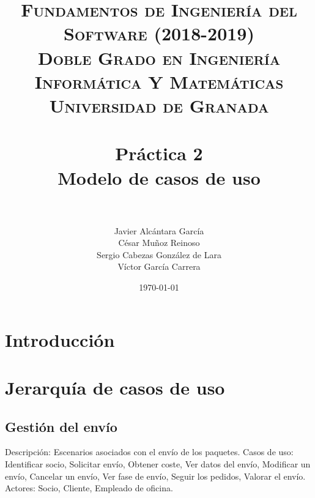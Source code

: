 



\title{	
\normalfont \normalsize 
\textsc{\textbf{Fundamentos de Ingeniería del Software (2018-2019)} \\ Doble Grado en Ingeniería Informática Y Matemáticas \\ Universidad de Granada} \\ [25pt] %
\horrule{0.5pt} \\[0.4cm] %
\huge \textbf{Práctica 2} \\ Modelo de casos de uso \\ %
\horrule{2pt} \\[0.5cm] %
}

\author{Javier Alcántara García\\ César Muñoz Reinoso \\ Sergio Cabezas González de Lara \\ Víctor García Carrera} %

\date{\normalsize\today} %





\maketitle %

\newpage %

\tableofcontents %

\newpage

\section{Introducción}
\section{Jerarquía de casos de uso}
\subsection{Gestión del envío}	
Descripción:
Escenarios asociados con el envío de los paquetes.
Casos de uso:
 Identificar socio, Solicitar envío, Obtener coste, Ver datos del envío, Modificar un envío, Cancelar un envío, Ver fase de envío, Seguir los pedidos, Valorar el envío.
Actores:
Socio, Cliente, Empleado de oficina.
